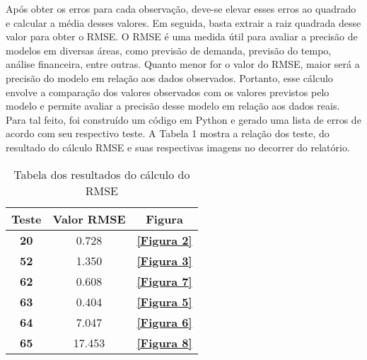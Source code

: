Após obter os erros para cada observação, deve-se elevar esses erros ao quadrado e calcular a média desses valores. Em seguida, basta extrair a raiz quadrada desse valor para obter o RMSE. O RMSE é uma medida útil para avaliar a precisão de modelos em diversas áreas, como previsão de demanda, previsão do tempo, análise financeira, entre outras. Quanto menor for o valor do RMSE, maior será a precisão do modelo em relação aos dados observados. Portanto, esse cálculo envolve a comparação dos valores observados com os valores previstos pelo modelo e permite avaliar a precisão desse modelo em relação aos dados reais. Para tal feito, foi construído um código em Python e gerado uma lista de erros de acordo com seu respectivo teste. A Tabela 1 mostra a relação dos teste, do resultado do cálculo RMSE e suas respectivas imagens no decorrer do relatório.
\vspace{2cm}
   

        \begin{table}[]
            \centering
            \begin{tabular}{|c|c|c|}
            \hline
            \multicolumn{1}{|l|}{\textbf{Teste}} & \multicolumn{1}{l|}{\textbf{Valor RMSE}} & \textbf{Figura} \\ \hline
            \textbf{20}                          &  0.728                                    & \textbf{\ref{Figura 2}}      \\ \hline
            \textbf{52}                          & 1.350                                   & \textbf{\ref{Figura 3}}      \\ \hline
            \textbf{62}                          & 0.608                                     & \textbf{\ref{Figura 7}}      \\ \hline
            \textbf{63}                          & 0.404                                     & \textbf{\ref{Figura 5}}      \\ \hline
            \textbf{64}                          & 7.047                                     & \textbf{\ref{Figura 6}}      \\ \hline
            \textbf{65}                          & 17.453                                     & \textbf{\ref{Figura 8}}      \\ \hline
            \end{tabular}
            \label{Tabela 1}
            \caption{Tabela dos resultados do cálculo do RMSE}
        \end{table}


